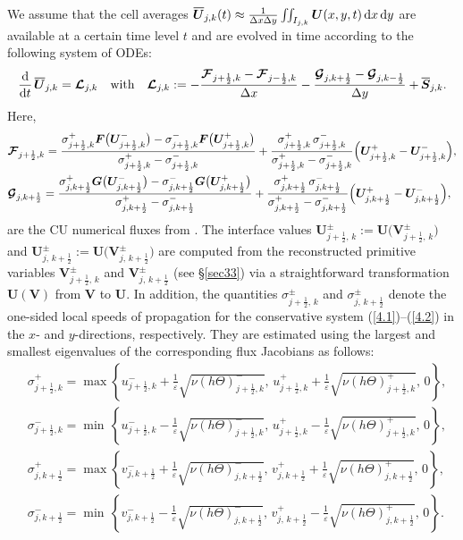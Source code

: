 \documentclass[a4paper,11pt,twoside]{article}
\numberwithin{equation}{section}
\numberwithin{figure}{section}
\numberwithin{table}{section}
\newcommand{\jL}{j-\frac{1}{2}}
\newcommand{\jR}{j+\frac{1}{2}}
\newcommand{\kL}{k-\frac{1}{2}}
\newcommand{\kR}{k+\frac{1}{2}}
\newcommand{\eps}{\varepsilon}
\newcommand{\dx}{\Delta x}
\newcommand{\dy}{\Delta y}
\newcommand{\bU}{\bm{U}}
\newcommand{\bV}{\bm{V}}
\newcommand{\bF}{\bm{F}}
\newcommand{\bG}{\bm{G}}
\newcommand{\bS}{\bm{S}}
\renewcommand{\d}{\mathrm{d}}
\newcommand\eref[1]{(\ref{#1})}
\newcommand*\xbar[1]{%
	\hbox{%
		\vbox{%
			\hrule height 0.5pt %
			\kern0.3ex%
			\hbox{%
				\kern-0.05em%
				\ensuremath{#1}%
				\kern-0.02em%
			}%
		}%
	}%
}
\begin{document}
We assume that the cell averages $\xbar{\bU}_{j,k}(t)\approx\frac{1}{\dx\dy}\iint_{I_{j,k}}\bU(x,y,t)\,\d x\,\d y$ are available at a
certain time level $t$ and are evolved in time according to the following system of ODEs:
\begin{equation}
\frac{\d}{\d t}\,\xbar{\bU}_{j,k}=\bm{{\cal L}}_{j,k}\quad\mbox{with}\quad\bm{{\cal L}}_{j,k}
:=-\frac{\bm{{\cal F}}_{\jR,k}-\bm{{\cal F}}_{\jL,k}}{\dx}-\frac{\bm{{\cal G}}_{j,\kR}-\bm{{\cal G}}_{j,\kL}}{\dy}+\xbar{\bS}_{j,k}.
\label{4.3}
\end{equation}
Here,
\begin{equation}
\begin{aligned}
&\bm{{\cal F}}_{\jR,k}=\frac{\sigma^+_{\jR,k}\bF\big(\bU^-_{\jR,k}\big)-\sigma^-_{\jR,k}\bF\big(\bU^+_{\jR,k}\big)}{\sigma^+_{\jR,k}-
\sigma^-_{\jR,k}}+\frac{\sigma^+_{\jR,k}\,\sigma^-_{\jR,k}}{\sigma^+_{\jR,k}-\sigma^-_{\jR,k}}\Big(\bU^+_{\jR,k}-\bU^-_{\jR,k}\Big),\\
&\bm{{\cal G}}_{j,\kR}=\frac{\sigma^+_{j,\kR}\bG\big(\bU^-_{j,\kR}\big)-\sigma^-_{j,\kR}\bG\big(\bU^+_{j,\kR}\big)}{\sigma^+_{j,\kR}-
\sigma^-_{j,\kR}}+\frac{\sigma^+_{j,\kR}\,\sigma^-_{j,\kR}}{\sigma^+_{j,\kR}-\sigma^-_{j,\kR}}\Big(\bU^+_{j,\kR}-\bU^-_{j,\kR}\Big),
\end{aligned}
\label{4.4}
\end{equation}
are the CU numerical fluxes from \cite{Kurganov_2001}. The interface values $\bU_{\jR,\,k}^\pm:=\bU\big(\bV_{\jR,\,k}^\pm\big)$ and 
$\bU_{j,\,\kR}^\pm:=\bU\big(\bV_{j,\,\kR}^\pm\big)$ are computed from the reconstructed primitive variables $\bV_{\jR,\,k}^\pm$ and 
$\bV_{j,\,\kR}^\pm$ (see \S\ref{sec33}) via a straightforward transformation $\bU(\bV)$ from $\bV$ to $\bU$. In addition, the quantities
$\sigma_{\jR,\,k}^\pm$ and $\sigma_{j,\,\kR}^\pm$ denote the one-sided local speeds of propagation for the conservative system
\eref{4.1}--\eref{4.2} in the $x$- and $y$-directions, respectively. They are estimated using the largest and smallest eigenvalues of the
corresponding flux Jacobians as follows:
\begin{equation}
\begin{aligned}
&\sigma^+_{\jR,k}=\max\left\{u^-_{\jR,k}+\frac{1}{\eps}\sqrt{\nu(h\Theta)^-_{\jR,k}},\,
u^+_{\jR,k}+\frac{1}{\eps}\sqrt{\nu(h\Theta)^+_{\jR,k}},\,0\right\},\\
&\sigma^-_{\jR,k}=\min\,\left\{u^-_{\jR,k}-\frac{1}{\eps}\sqrt{\nu(h\Theta)^-_{\jR,k}},\,
u^+_{\jR,k}-\frac{1}{\eps}\sqrt{\nu(h\Theta)^+_{\jR,k}},\,0\right\},\\
&\sigma^+_{j,\kR}=\max\left\{v^-_{j,\kR}+\frac{1}{\eps}\sqrt{\nu(h\Theta)^-_{j,\kR}},\,
v^+_{j,\kR}+\frac{1}{\eps}\sqrt{\nu(h\Theta)^+_{j,\kR}},\,0\right\},\\
&\sigma^-_{j,\kR}=\min\,\left\{v^-_{j,\kR}-\frac{1}{\eps}\sqrt{\nu(h\Theta)^-_{j,\kR}},\,
v^+_{j,\,\kR}-\frac{1}{\eps}\sqrt{\nu(h\Theta)^+_{j,\kR}},\,0\right\}.
\end{aligned}
\label{4.5}
\end{equation}
\end{document}
